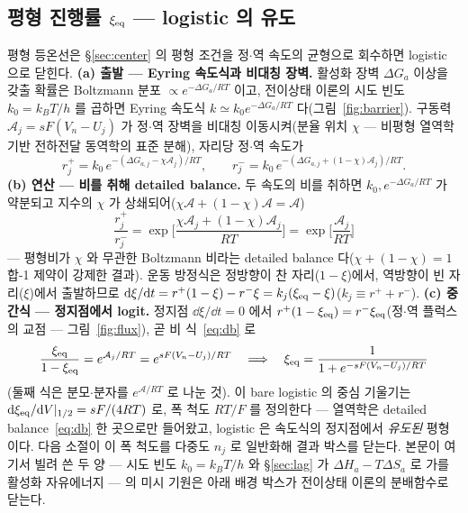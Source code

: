 \subsection{평형 진행률 $\xi_{\mathrm{eq}}$ --- logistic 의 유도}\label{sec:width-logistic}
평형 등온선은 \S\ref{sec:center} 의 평형 조건을 정$\cdot$역 속도의 균형으로 회수하면 logistic 으로 닫힌다.
\textbf{(a) 출발 --- Eyring 속도식과 비대칭 장벽.} 활성화 장벽 $\Delta G_a$ 이상을 갖출 확률은 Boltzmann 분포
$\propto e^{-\Delta G_a/RT}$ 이고, 전이상태 이론의 시도 빈도 $k_0=k_BT/h$ 를 곱하면 Eyring 속도식
$k\simeq k_0e^{-\Delta G_a/RT}$ 다(그림~\ref{fig:barrier})\cite{eyring1935}. 구동력 $\mathcal A_j=sF(V_n-U_j)$ 가 정$\cdot$역 장벽을
비대칭 이동시켜(분율 위치 $\chi$ --- 비평형 열역학 기반 전하전달 동역학의 표준 분해\cite{bazant2013}), 자리당 정$\cdot$역 속도가
\begin{equation}
r_j^+=k_0\,e^{-(\Delta G_{a,j}-\chi\mathcal A_j)/RT},\qquad
r_j^-=k_0\,e^{-(\Delta G_{a,j}+(1-\chi)\mathcal A_j)/RT}.
\label{eq:bv}
\end{equation}
\textbf{(b) 연산 --- 비를 취해 detailed balance.} 두 속도의 비를 취하면 $k_0,e^{-\Delta G_a/RT}$ 가 약분되고 지수의
$\chi$ 가 상쇄되어($\chi\mathcal A+(1-\chi)\mathcal A=\mathcal A$)
\begin{equation}
\frac{r_j^+}{r_j^-}=\exp\!\Big[\frac{\chi\mathcal A_j+(1-\chi)\mathcal A_j}{RT}\Big]=\exp\!\Big[\frac{\mathcal A_j}{RT}\Big]
\label{eq:db}
\end{equation}
--- 평형비가 $\chi$ 와 무관한 Boltzmann 비라는 detailed balance 다($\chi+(1-\chi)=1$ 합-1 제약이 강제한 결과). 운동
방정식은 정방향이 찬 자리($1-\xi$)에서, 역방향이 빈 자리($\xi$)에서 출발하므로
$\mathrm{d}\xi/\mathrm{d} t=r^+(1-\xi)-r^-\xi=k_j(\xi_{\mathrm{eq}}-\xi)$($k_j\equiv r^++r^-$). \textbf{(c) 중간식 --- 정지점에서 logit.}
정지점 $\dd\xi/\dd t=0$ 에서 $r^+(1-\xi_{\mathrm{eq}})=r^-\xi_{\mathrm{eq}}$(정$\cdot$역 플럭스의 교점 --- 그림~\ref{fig:flux}), 곧
비 식~\eqref{eq:db} 로
\begin{equation}
\frac{\xi_{\mathrm{eq}}}{1-\xi_{\mathrm{eq}}}=e^{\mathcal A_j/RT}=e^{sF(V_n-U_j)/RT}
\quad\Longrightarrow\quad
\xi_{\mathrm{eq}}=\frac{1}{1+e^{-sF(V_n-U_j)/RT}}
\label{eq:logisticsolve}
\end{equation}
(둘째 식은 분모$\cdot$분자를 $e^{\mathcal A/RT}$ 로 나눈 것). 이 bare logistic 의 중심 기울기는
$\mathrm{d}\xi_{\mathrm{eq}}/\mathrm{d} V|_{1/2}=sF/(4RT)$ 로, 폭 척도 $RT/F$ 를 정의한다 --- 열역학은 detailed balance~\eqref{eq:db}
한 곳으로만 들어왔고, logistic 은 속도식의 정지점에서 \emph{유도된} 평형이다. 다음 소절이 이 폭 척도를 다중도
$n_j$ 로 일반화해 결과 박스를 닫는다. 본문이 여기서 빌려 쓴 두 양 --- 시도 빈도 $k_0=k_BT/h$ 와
\S\ref{sec:lag} 가 $\Delta H_a-T\Delta S_a$ 로 가를 활성화 자유에너지 --- 의 미시 기원은 아래 배경 박스가
전이상태 이론의 분배함수로 닫는다.

